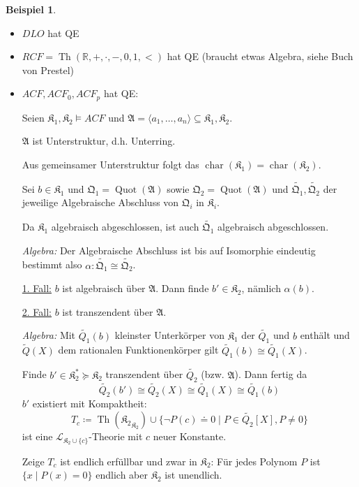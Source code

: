 \documentclass[12pt,parskip=full]{scrartcl}
\newcommand{\setR}{\mathbb{R}}
\newcommand{\heading}{\underline}
\theoremstyle{definition}
\newtheorem{example}[theorem]{Beispiel}
\begin{document}
	\begin{example}
		\begin{itemize}
			\item $DLO$ hat QE
			\item $RCF = \operatorname{Th}(\setR, +, \cdot, -, 0, 1, <)$ hat QE (braucht etwas Algebra, siehe Buch von Prestel)
			\item $ACF, ACF_0, ACF_p$ hat QE:
			
			Seien $\mathfrak{K}_1, \mathfrak{K}_2 \models ACF$ und $\mathfrak{A} = \langle a_1, \dots, a_n \rangle \subseteq \mathfrak{K}_1, \mathfrak{K}_2$.
			
			$\mathfrak{A}$ ist Unterstruktur, d.h. Unterring.
			
			Aus gemeinsamer Unterstruktur folgt das $\operatorname{char}(\mathfrak{K}_1) = \operatorname{char}(\mathfrak{K}_2)$.
			
			Sei $b \in \mathfrak{K}_1$ und $\mathfrak{Q}_1 = \operatorname{Quot}(\mathfrak{A})$ sowie $\mathfrak{Q}_2 = \operatorname{Quot}(\mathfrak{A})$ und $\tilde{\mathfrak{Q}_1}, \tilde{\mathfrak{Q}_2}$ der jeweilige Algebraische Abschluss von $\mathfrak{Q}_i$ in $\mathfrak{K}_i$.
			
			Da $\mathfrak{K}_1$ algebraisch abgeschlossen, ist auch $\tilde{\mathfrak{Q}_1}$ algebraisch abgeschlossen.
			
			\textit{Algebra:} Der Algebraische Abschluss ist bis auf Isomorphie eindeutig bestimmt also $\alpha: \tilde{\mathfrak{Q}_1} \cong \tilde{\mathfrak{Q}_2}$.
			
			\heading{1. Fall:} $b$ ist algebraisch über $\mathfrak{A}$. Dann finde $b' \in \mathfrak{K}_2$, nämlich $\alpha(b)$.
			
			\heading{2. Fall:} $b$ ist transzendent über $\mathfrak{A}$.
			
			\textit{Algebra:} Mit $\tilde{Q_1}(b)$ kleinster Unterkörper von $\mathfrak{K}_1$ der $\tilde{Q_1}$ und $b$ enthält und $\tilde{Q}(X)$ dem rationalen Funktionenkörper gilt $\tilde{Q_1}(b) \cong \tilde{Q_1}(X)$.
			
			Finde $b' \in \mathfrak{K}_2^* \succcurlyeq \mathfrak{K}_2$ transzendent über $\tilde{Q_2}$ (bzw. $\mathfrak{A}$). Dann fertig da
			\begin{equation*}
				\tilde{Q_2}(b') \cong \tilde{Q_2}(X) \cong \tilde{Q_1}(X) \cong \tilde{Q_1}(b)
			\end{equation*}
			$b'$ existiert mit Kompaktheit:
			\begin{equation*}
				T_c \coloneqq \operatorname{Th}({\mathfrak{K}_2}_{\mathfrak{K}_2}) \cup \{ \lnot P(c) \doteq 0 \mid P \in \tilde{Q_2}[X], P \neq 0 \}
			\end{equation*}
			ist eine $\mathcal{L}_{\mathfrak{K}_2 \cup \{ c \}}$-Theorie mit $c$ neuer Konstante.
			
			Zeige $T_c$ ist endlich erfüllbar und zwar in $\mathfrak{K}_2$: Für jedes Polynom $P$ ist $\{ x \mid P(x) = 0 \}$ endlich aber $\mathfrak{K}_2$ ist unendlich.
		\end{itemize}
	\end{example}
\end{document}
